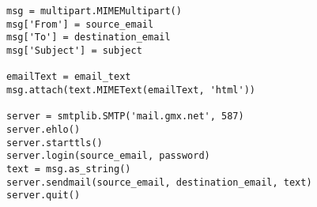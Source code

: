 \begin{lstlisting}[caption=Implementierung des versenden einer Phishing-Mail,label={lst:SendEmail}]
msg = multipart.MIMEMultipart()
msg['From'] = source_email
msg['To'] = destination_email
msg['Subject'] = subject

emailText = email_text
msg.attach(text.MIMEText(emailText, 'html'))

server = smtplib.SMTP('mail.gmx.net', 587) 
server.ehlo()
server.starttls()
server.login(source_email, password) 
text = msg.as_string()
server.sendmail(source_email, destination_email, text)
server.quit()
\end{lstlisting}














	